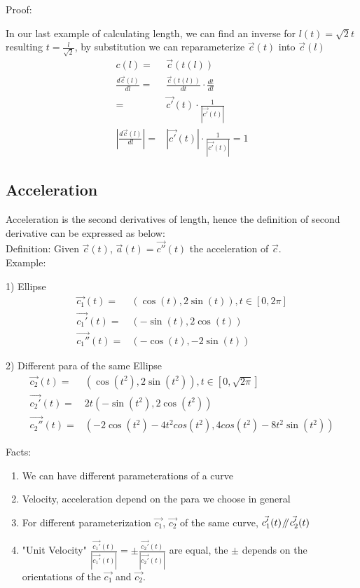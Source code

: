 \documentclass{article}
\newcommand{\parallelsum}{\mathbin{\!/\mkern-5mu/\!}}
\begin{document}
        Proof:
        
        In our last example of calculating length, we can find an inverse for $l(t) = \sqrt{2}t$ resulting $t = \frac{l}{\sqrt{2}}$, by substitution we can reparameterize $\vec{c}(t)$ into $\vec{c}(l)$\\
        
        \begin{align}
            c(l) =& \vec{c}(t(l))\\
            \frac{d\vec{c}(l)}{dl} =& \frac{\vec{c}(t(l))}{dt}\cdot\frac{dt}{dl}\\
            =&\vec{c'}(t)\cdot\frac{1}{|\vec{c'}(t)|}\\
            |\frac{d\vec{c}(l)}{dl}|=&|\vec{c'}(t)|\cdot\frac{1}{|\vec{c'}(t)|}=1
        \end{align}

    \subsection{Acceleration}
        Acceleration is the second derivatives of length, hence the definition of second derivative can be expressed as below:\\
        
        Definition: Given $\vec{c}(t)$, $\vec{a}(t) = \vec{c''}(t)$ the acceleration of $\vec{c}$.\\
        
        Example:
        
        1) Ellipse
        \begin{align}
            \vec{c_1}(t) =& (\cos(t),2\sin(t)), t\in[0,2\pi]\\
            \vec{c_1'}(t) =& (-\sin(t),2\cos(t))\\
            \vec{c_1''}(t) =& (-\cos(t),-2\sin(t))
        \end{align}
        
        2) Different para of the same Ellipse
        \begin{align}
            \vec{c_2}(t) =& (\cos(t^2),2\sin(t^2)), t\in[0,\sqrt{2\pi}]\\
            \vec{c_2'}(t) =& 2t(-\sin(t^2),2\cos(t^2))\\
            \vec{c_2''}(t) =& (-2\cos(t^2)-4t^2cos(t^2),4cos(t^2)-8t^2\sin(t^2))
        \end{align}
        
        Facts:
        \begin{enumerate}
            \item We can have different parameterations of a curve
            \item Velocity, acceleration depend on the para we choose in general
            \item For different parameterization $\vec{c_1}$, $\vec{c_2}$ of the same curve, $\vec{c_1'}(t)\parallelsum\vec{c_2'}(t)$
            \item "Unit Velocity" $\frac{\vec{c_1'}(t)}{|\vec{c_1'}(t)|}=\pm\frac{\vec{c_2'}(t)}{|\vec{c_2'}(t)|}$ are equal, the $\pm$ depends on the orientations of the $\vec{c_1}$ and $\vec{c_2}$.
        \end{enumerate}
        
\end{document}
